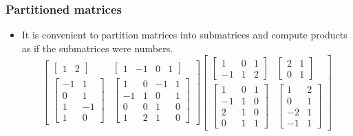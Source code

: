 \documentclass[notheorems,mathserif,table,compress]{beamer}  %
\begin{document}
\begin{frame}
\frametitle{Partitioned matrices}
\begin{itemize}
\item It is convenient to partition matrices into submatrices and compute products as if the submatrices were numbers.
\begin{displaymath}
\begin{bmatrix}
\begin{bmatrix}
1 & 2
\end{bmatrix} &
\begin{bmatrix}
1 & -1 & 0 & 1
\end{bmatrix}\\
\begin{bmatrix}
-1 & 1\\
0 & 1 \\
1 & -1\\
1 & 0
\end{bmatrix}&
\begin{bmatrix}
1 & 0 & -1 & 1\\
-1 & 1 & 0 & 1\\
0 & 0 & 1 & 0\\
1 & 2 & 1 & 0
\end{bmatrix}
\end{bmatrix}
\begin{bmatrix}
\begin{bmatrix}
1 & 0 & 1\\
-1 & 1 & 2
\end{bmatrix} &
\begin{bmatrix}
2 & 1\\
0 & 1
\end{bmatrix}\\
\begin{bmatrix}
1 & 0 & 1\\
-1 & 1 & 0\\
2 & 1 & 0\\
0 & 1 & 1
\end{bmatrix}&
\begin{bmatrix}
1 & 2\\
0 & 1 \\
-2 & 1\\
-1 & 1
\end{bmatrix}
\end{bmatrix}
\end{displaymath}


\end{itemize}
\end{frame}
\end{document}

